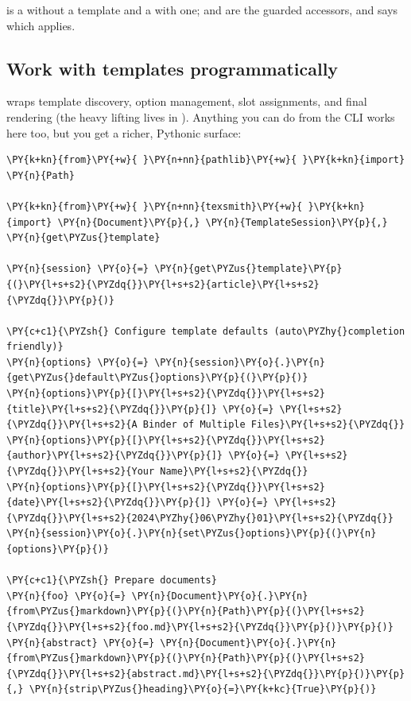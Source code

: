 \documentclass[a4paper,twoside]{article}
\begin{document}
 is a  without a template and a
 with one;  and 
are the guarded accessors, and  says which applies.
\subsection{Work with templates programmatically}
 wraps template discovery, option management, slot assignments, and final rendering (the heavy lifting lives in ).  Anything you can do from the CLI works here too, but you get a richer, Pythonic surface:
\begin{tscode}[lang=python, engine=pygments]
\begin{Verbatim}[commandchars=\\\{\},breaklines, breakanywhere, commandchars=\\\{\}]
\PY{k+kn}{from}\PY{+w}{ }\PY{n+nn}{pathlib}\PY{+w}{ }\PY{k+kn}{import} \PY{n}{Path}

\PY{k+kn}{from}\PY{+w}{ }\PY{n+nn}{texsmith}\PY{+w}{ }\PY{k+kn}{import} \PY{n}{Document}\PY{p}{,} \PY{n}{TemplateSession}\PY{p}{,} \PY{n}{get\PYZus{}template}

\PY{n}{session} \PY{o}{=} \PY{n}{get\PYZus{}template}\PY{p}{(}\PY{l+s+s2}{\PYZdq{}}\PY{l+s+s2}{article}\PY{l+s+s2}{\PYZdq{}}\PY{p}{)}

\PY{c+c1}{\PYZsh{} Configure template defaults (auto\PYZhy{}completion friendly)}
\PY{n}{options} \PY{o}{=} \PY{n}{session}\PY{o}{.}\PY{n}{get\PYZus{}default\PYZus{}options}\PY{p}{(}\PY{p}{)}
\PY{n}{options}\PY{p}{[}\PY{l+s+s2}{\PYZdq{}}\PY{l+s+s2}{title}\PY{l+s+s2}{\PYZdq{}}\PY{p}{]} \PY{o}{=} \PY{l+s+s2}{\PYZdq{}}\PY{l+s+s2}{A Binder of Multiple Files}\PY{l+s+s2}{\PYZdq{}}
\PY{n}{options}\PY{p}{[}\PY{l+s+s2}{\PYZdq{}}\PY{l+s+s2}{author}\PY{l+s+s2}{\PYZdq{}}\PY{p}{]} \PY{o}{=} \PY{l+s+s2}{\PYZdq{}}\PY{l+s+s2}{Your Name}\PY{l+s+s2}{\PYZdq{}}
\PY{n}{options}\PY{p}{[}\PY{l+s+s2}{\PYZdq{}}\PY{l+s+s2}{date}\PY{l+s+s2}{\PYZdq{}}\PY{p}{]} \PY{o}{=} \PY{l+s+s2}{\PYZdq{}}\PY{l+s+s2}{2024\PYZhy{}06\PYZhy{}01}\PY{l+s+s2}{\PYZdq{}}
\PY{n}{session}\PY{o}{.}\PY{n}{set\PYZus{}options}\PY{p}{(}\PY{n}{options}\PY{p}{)}

\PY{c+c1}{\PYZsh{} Prepare documents}
\PY{n}{foo} \PY{o}{=} \PY{n}{Document}\PY{o}{.}\PY{n}{from\PYZus{}markdown}\PY{p}{(}\PY{n}{Path}\PY{p}{(}\PY{l+s+s2}{\PYZdq{}}\PY{l+s+s2}{foo.md}\PY{l+s+s2}{\PYZdq{}}\PY{p}{)}\PY{p}{)}
\PY{n}{abstract} \PY{o}{=} \PY{n}{Document}\PY{o}{.}\PY{n}{from\PYZus{}markdown}\PY{p}{(}\PY{n}{Path}\PY{p}{(}\PY{l+s+s2}{\PYZdq{}}\PY{l+s+s2}{abstract.md}\PY{l+s+s2}{\PYZdq{}}\PY{p}{)}\PY{p}{,} \PY{n}{strip\PYZus{}heading}\PY{o}{=}\PY{k+kc}{True}\PY{p}{)}


\end{Verbatim}
\end{tscode}
\end{document}
